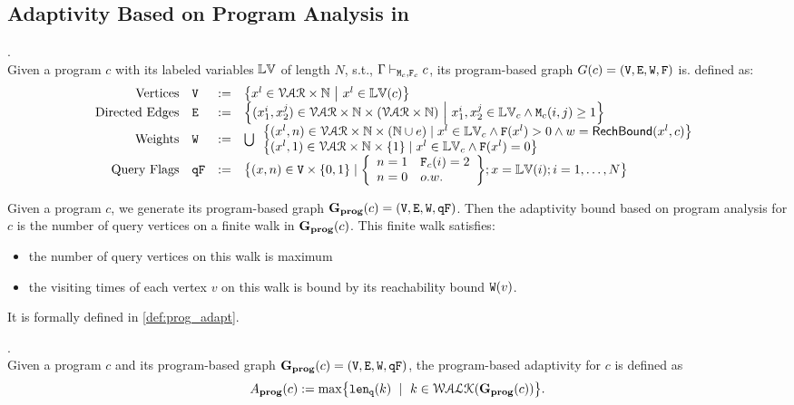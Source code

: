 \subsection{Adaptivity Based on Program Analysis in \THESYSTEM}
%
\begin{defn}
.
\label{def:prog-based_graph}
\\
Given a program ${c}$ with its labeled variables $\mathbb{LV}$ of length $N$, s.t.,
$\Gamma \vdash_{\mathtt{M}_c, \mathtt{F}_c} {c}$, 
its program-based graph 
$G({c}) = (\mathtt{V}, \mathtt{E}, \mathtt{W}, \mathtt{F})$ is. defined as:
\\
\[
\begin{array}{rlcl}
\text{Vertices} &
\vertxs & := & \left\{ 
x^l \in \mathcal{VAR} \times \mathbb{N}
~ \middle\vert ~
x^l \in \lvar({{c}})
\right\}
\\
\text{Directed Edges} &
\edges & := & 
\left\{ 
  ({x}_1^{i}, {x}_2^{j}) \in \mathcal{VAR} \times \mathbb{N} \times (\mathcal{VAR} \times \mathbb{N})
  ~ \middle\vert ~
 	{x}_1^{i}, {x}_2^{j} \in \lvar_{{c}}
	\land \Mtrix_c(i, j) \geq 1
\right\}
\\
\text{Weights} &
\weights & := &
\bigcup
\begin{array}{l}
	\big\{ (x^l, n) \in \mathcal{VAR} \times \mathbb{N} \times (\mathbb{N} \cup \expr)
	\mid
	x^l \in \lvar_{{c}} \land \flag(x^l) > 0 \land w = \rb(x^l, c)
	\big\} 
	\\
	\big\{(x^l, 1)  \in \mathcal{VAR} \times \mathbb{N} \times \{1\} 
	\mid
	x^l \in \lvar_{{c}} \land \flag(x^l) = 0
	\big\}
\end{array} 
\\
\text{Query Flags} &
\qflag & := & 
\big\{({x}, n)  \in \vertxs \times \{0, 1\} 
\mid 
\left\{
\begin{array} {ll}
n = 1 & \flag_c(i) = 2
\\  
n = 0 & o.w.
\end{array}
\right\};
{x} = \lvar(i); i = 1, \ldots, N
\big\}
\end{array}
\]
\end{defn} 
%
Given a program ${c}$, we generate its program-based graph 
$\mathtt{\bf{G_{prog}}}({c}) = (\mathtt{V}, \mathtt{E}, \mathtt{W}, \mathtt{qF})$.
%
Then the adaptivity bound based on program analysis for ${c}$ is the number of query vertices on a finite walk in $\mathtt{\bf{G_{prog}}}({c})$. This finite walk satisfies:
\begin{itemize}
\item the number of query vertices on this walk is maximum
\item the visiting times of each vertex $v$ on this walk is bound by its reachability bound $\mathtt{W}(v)$.
\end{itemize}
It is formally defined in \ref{def:prog_adapt}.
%
%
\begin{defn}
.
\label{def:prog_adapt}
\\
{
Given a program ${c}$ and its program-based graph 
$\mathtt{\bf{G_{prog}}}({c}) = (\mathtt{V}, \mathtt{E}, \mathtt{W}, \mathtt{qF})$,
%
the program-based adaptivity for $c$ is defined as%
\[
\progA({c}) 
:= \max
\left\{ \qlen(k)\ \mid \  k\in \walks(\progG({c}))\right \}.
\]
}
\end{defn}  

